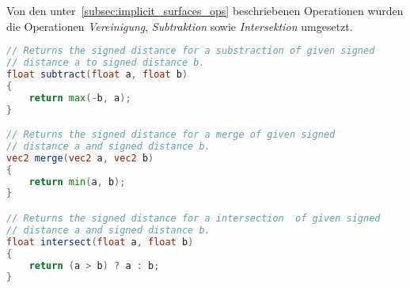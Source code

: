% 

Von den unter~\autoref{subsec:implicit_surfaces_ops} beschriebenen
Operationen wurden die Operationen \textit{Vereinigung}, \textit{Subtraktion} sowie
\textit{Intersektion} umgesetzt.

\begin{minipage}{\linewidth}
\begin{lstlisting}[language=GLSL,caption={Umsetzung der Operationen
        \textit{Vereinigung}, \textit{Subtraktion} sowie
        \textit{Intersektion} für implizite Oberflächen in
        GLSL.},label={alg:glsl_ops},captionpos=b,emph={subtract,merge,intersect}]
// Returns the signed distance for a substraction of given signed
// distance a to signed distance b.
float subtract(float a, float b)
{
    return max(-b, a);
}

// Returns the signed distance for a merge of given signed
// distance a and signed distance b.
vec2 merge(vec2 a, vec2 b)
{
    return min(a, b);
}

// Returns the signed distance for a intersection  of given signed
// distance a and signed distance b.
float intersect(float a, float b)
{
    return (a > b) ? a : b;
}
\end{lstlisting}
\end{minipage}

